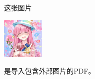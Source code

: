 \documentclass{ctexart}
\begin{document}
这张图片
\begin{center}
    \includegraphics[height=2cm]{-9lddQ2v-dmawZ12T3cSzk-zk.jpg}
\end{center}
是导入包含外部图片的PDF。
\end{document}
